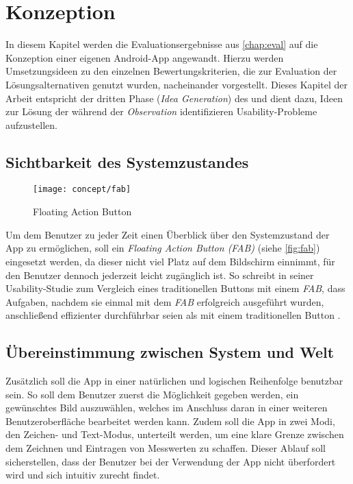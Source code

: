 \chapter{Konzeption}\label{chap:concept}
In diesem Kapitel werden die Evaluationsergebnisse aus \autoref{chap:eval} auf die Konzeption einer eigenen Android-App angewandt.
Hierzu werden Umsetzungsideen zu den einzelnen Bewertungskriterien, die zur Evaluation der Lösungsalternativen genutzt wurden, nacheinander vorgestellt.
Dieses Kapitel der Arbeit entspricht der dritten Phase (\emph{Idea Generation}) des \hcdp{} und dient dazu, Ideen zur Lösung der während der \emph{Observation} identifizieren Usability-Probleme aufzustellen.

\section{Sichtbarkeit des Systemzustandes}
\begin{wrapfigure}{R}{0.4\textwidth}
	\centering
	\texttt{[image: concept/fab]}
	\caption{Floating Action Button}
	\label{fig:fab}
\end{wrapfigure}

Um dem Benutzer zu jeder Zeit einen Überblick über den Systemzustand der App zu ermöglichen, soll ein \emph{Floating Action Button (FAB)} (siehe \autoref{fig:fab}) eingesetzt werden, da dieser nicht viel Platz auf dem Bildschirm einnimmt, für den Benutzer dennoch jederzeit leicht zugänglich ist.
So schreibt \citeauthor{SJ16} in seiner Usability-Studie zum Vergleich eines traditionellen Buttons mit einem \emph{FAB}, dass Aufgaben, nachdem sie einmal mit dem \emph{FAB} erfolgreich ausgeführt wurden, anschließend effizienter durchführbar seien als mit einem traditionellen Button \citep[Seiten 14--16]{SJ16}.

\section{Übereinstimmung zwischen System und Welt}
Zusätzlich soll die App in einer natürlichen und logischen Reihenfolge benutzbar sein.
So soll dem Benutzer zuerst die Möglichkeit gegeben werden, ein gewünschtes Bild auszuwählen, welches im Anschluss daran in einer weiteren Benutzeroberfläche bearbeitet werden kann.
Zudem soll die App in zwei Modi, den Zeichen- und Text-Modus, unterteilt werden, um eine klare Grenze zwischen dem Zeichnen und Eintragen von Messwerten zu schaffen.
Dieser Ablauf soll sicherstellen, dass der Benutzer bei der Verwendung der App nicht überfordert wird und sich intuitiv zurecht findet.

